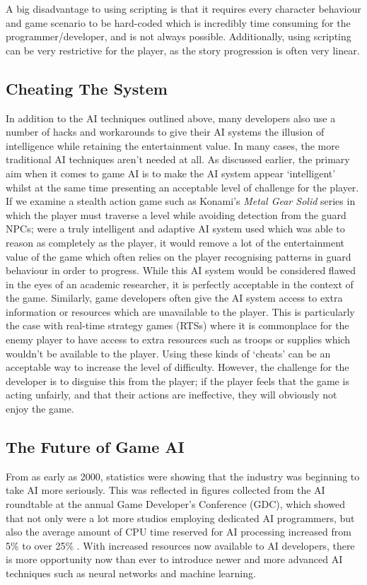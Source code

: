 \documentclass[a4paper,oneside]{report}
\begin{document}
A big disadvantage to using scripting is that it requires every character behaviour and game scenario to be hard-coded which is incredibly time consuming for the programmer/developer, and is not always possible. Additionally, using scripting can be very restrictive for the player, as the story progression is often very linear.

\subsection{Cheating The System}

In addition to the AI techniques outlined above, many developers also use a number of hacks and workarounds to give their AI systems the illusion of intelligence while retaining the entertainment value. In many cases, the more traditional AI techniques aren't needed at all. As discussed earlier, the primary aim when it comes to game AI is to make the AI system appear `intelligent' whilst at the same time presenting an acceptable level of challenge for the player. If we examine a stealth action game such as Konami's \emph{Metal Gear Solid} series in which the player must traverse a level while avoiding detection from the guard NPCs; were a truly intelligent and adaptive AI system used which was able to reason as completely as the player, it would remove a lot of the entertainment value of the game which often relies on the player recognising patterns in guard behaviour in order to progress. While this AI system would be considered flawed in the eyes of an academic researcher, it is perfectly acceptable in the context of the game. Similarly, game developers often give the AI system access to extra information or resources which are unavailable to the player. This is particularly the case with real-time strategy games (RTSs) where it is commonplace for the enemy player to have access to extra resources such as troops or supplies which wouldn't be available to the player. Using these kinds of `cheats' can be an acceptable way to increase the level of difficulty. However, the challenge for the developer is to disguise this from the player; if the player feels that the game is acting unfairly, and that their actions are ineffective, they will obviously not enjoy the game.

\subsection{The Future of Game AI}

From as early as 2000, statistics were showing that the industry was beginning to take AI more seriously. This was reflected in figures collected from the AI roundtable at the annual Game Developer's Conference (GDC), which showed that not only were a lot more studios employing dedicated AI programmers, but also the average amount of CPU time reserved for AI processing increased from 5\% to over 25\% \cite{Woodcock:oq}. With increased resources now available to AI developers, there is more opportunity now than ever to introduce newer and more advanced AI techniques such as neural networks and machine learning.
\end{document}
